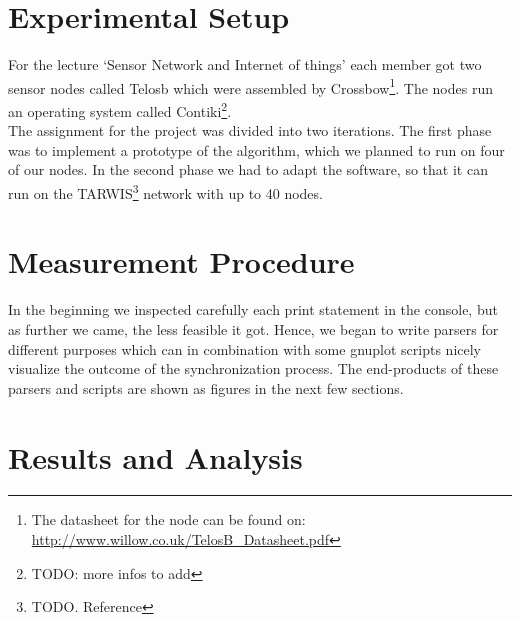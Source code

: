 \documentclass{llncs}
\begin{document}
\section{Experimental Setup}

For the lecture `Sensor Network and Internet of things' each member got two sensor nodes called Telosb which were assembled by Crossbow\footnote{The datasheet for the node can be found on: \url{http://www.willow.co.uk/TelosB_Datasheet.pdf}}. The nodes run an operating system called Contiki\footnote{TODO: more infos to add}.\\
The assignment for the project was divided into two iterations. The first phase was to implement a prototype of the algorithm, which we planned to run on four of our nodes. In the second phase we had to adapt the software, so that it can run on the TARWIS\footnote{TODO. Reference} network with up to 40 nodes.



\section{Measurement Procedure}
In the beginning we inspected carefully each print statement in the console, but as further we came, the less feasible it got. Hence, we began to write parsers for different purposes which can in combination with some gnuplot scripts nicely visualize the outcome of the synchronization process. The end-products of these parsers and scripts are shown as figures in the next few sections.

\section{Results and Analysis}
\end{document}
